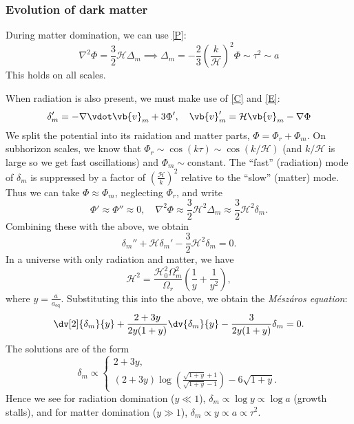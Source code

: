 \documentclass{jknotes}
\begin{document}
\subsubsection*{Evolution of dark matter}
During matter domination, we can use \eqref{P}:
\begin{equation}
    \nabla^2\Phi=\frac32\mathcal{H}\Delta_m\implies\Delta_m = -\frac23\left(\frac{k}{\mathcal{H}}\right)^2\Phi \sim \tau^2 \sim a
\end{equation}
This holds on all scales.

When radiation is also present, we must make use of \eqref{C} and \eqref{E}:
\begin{equation}
    \delta_m'=-\nabla\vdot\vb{v}_m + 3\Phi',\quad\vb{v}_m' = \mathcal{H}\vb{v}_m - \nabla\Phi
\end{equation}
We split the potential into its raidation and matter parts, \(\Phi = \Phi_r + \Phi_m\). On subhorizon scales, we know that \(\Phi_r\sim\cos(k\tau)\sim\cos(k/\mathcal{H})\) (and \(k/\mathcal{H}\) is large so we get fast oscillations) and \(\Phi_m\sim\text{constant}\). The ``fast'' (radiation) mode of \(\delta_m\) is suppressed by a factor of \(\left(\frac{\mathcal{H}}{k}\right)^2\) relative to the ``slow'' (matter) mode. Thus we can take \(\Phi \approx \Phi_m\), neglecting \(\Phi_r\), and write
\begin{equation}
    \Phi'\approx\Phi''\approx0,\quad\nabla^2\Phi\approx\frac32\mathcal{H}^2\Delta_m\approx\frac32\mathcal{H}^2\delta_m.
\end{equation}
Combining these with the above, we obtain 
\begin{equation}
    \delta_m''+ \mathcal{H}\delta_m' - \frac32\mathcal{H}^2\delta_m=0.
\end{equation}
In a universe with only radiation and matter, we have
\begin{equation}
    \mathcal{H}^2 = \frac{\mathcal{H}_0^2\Omega_m^2}{\Omega_r}\left(\frac1y+\frac1{y^2}\right),
\end{equation}
where \(y = \frac{a}{a_{\text{eq}}}\). Substituting this into the above, we obtain the \emph{M\'esz\'aros equation}:
\begin{equation}
    \dv[2]{\delta_m}{y} + \frac{2+3y}{2y(1+y)}\dv{\delta_m}{y} - \frac3{2y(1+y)}\delta_m = 0.
\end{equation}
The solutions are of the form
\begin{equation}
    \delta_m \propto
    \begin{cases}
        2+3y, \\
        (2+3y)\log\left(\frac{\sqrt{1+y}+1}{\sqrt{1+y}-1}\right) - 6\sqrt{1+y}.
    \end{cases}
\end{equation}
Hence we see for radiation domination (\(y\ll1\)), \(\delta_m\propto\log y\propto\log a\) (growth stalls), and for matter domination (\(y\gg1\)), \(\delta_m\propto y\propto a \propto \tau^2\).
\end{document}
